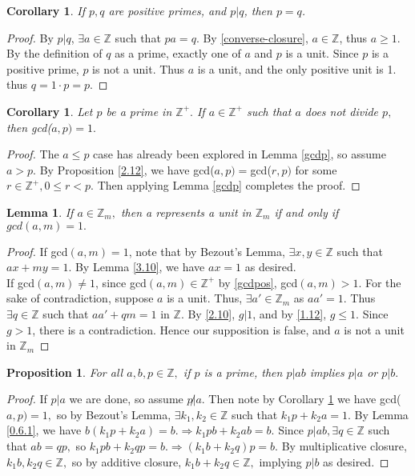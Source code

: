 \documentclass{article}
\newcommand{\Z}{\mathbb{Z}}
\newcommand{\FTSOC}{For the sake of contradiction}
\newcommand{\st}{such that }
\newtheorem{cor}[thm]{Corollary}
\newtheorem{lem}[thm]{Lemma}
\newtheorem{prop}[thm]{Proposition}
\begin{document}
\begin{cor}
\label{gcdp-cor}
If $p, q$ are positive primes, and $p|q$, then $p=q$. 
\end{cor}

\begin{proof}
By $p|q$, $\exists a\in\Z$ \st $pa=q$. By \ref{converse-closure}, $a\in \Z$, thus $a\geq 1$. By the definition of $q$ as a prime, exactly one of $a$ and $p$ is a unit. Since $p$ is a positive prime, $p$ is not a unit. Thus $a$ is a unit, and the only positive unit is 1. thus $q=1\cdot p=p$.
\end{proof}

\begin{cor}
\label{gcdp2} Let $p$ be a prime in $\Z^{+}.$ If $a\in\Z^{+}$ such that $a$ does not divide $p,$ then gcd($a,p)=1.$
\end{cor}
\begin{proof}
The $a\leq p$ case has already been explored in Lemma \ref{gcdp}, so assume $a>p$. By Proposition \ref{2.12}, we have gcd($a,p)=$gcd($r,p)$ for some $r\in \Z^{+}, 0\leq r< p.$ Then applying Lemma \ref{gcdp} completes the proof.
\end{proof}

\begin{lem}
\label{5.9}If $a\in \Z_{m},$ then a represents a unit in $\Z_{m}$ if and only if $gcd(a,m)=1.$
\end{lem}
\begin{proof}
\noindent If gcd$(a,m)=1$, note that by Bezout's Lemma, $\exists x,y\in \Z$ \st $ax+my=1.$ By Lemma \ref{3.10}, we have $ax=1$ as desired.\\

\noindent If gcd$(a,m)\neq 1$, since gcd$(a,m)\in \Z^{+}$ by \ref{gcdpos}, gcd$(a,m)>1$. \FTSOC, suppose $a$ is a unit. Thus, $\exists a' \in \Z_{m}$ as $aa'=1$. Thus $\exists q\in \Z$ \st $aa'+qm=1$ in $\Z$. By \ref{2.10}, $g|1$, and by \ref{1.12}, $g\leq 1$. Since $g>1$, there is a contradiction. Hence our supposition is false, and $a$ is not a unit in $\Z_{m}$
\end{proof}

\begin{prop}
\label{5.7}For all $a,b,p\in \Z,$ if $p$ is a prime, then $p|ab$ implies $p|a$ or $p|b.$
\end{prop}
\begin{proof}
If $p|a$ we are done, so assume $p\not|a.$ Then note by Corollary \ref{gcdp2} we have gcd($a,p)=1,$ so by Bezout's Lemma, $\exists k_{1},k_{2}\in \Z$ such that $k_{1}p+k_{2}a=1.$ By Lemma \ref{0.6.1}, we have $b(k_{1}p+k_{2}a)=b. \Rightarrow k_{1}pb+k_{2}ab = b.$ Since $p|ab, \exists q\in \Z$ \st $ab=qp,$ so $k_{1}pb+k_{2}qp = b. \Rightarrow (k_{1}b + k_{2}q)p=b.$ By multiplicative closure, $k_{1}b, k_{2}q\in \Z,$ so by additive closure, $k_{1}b + k_{2}q\in \Z,$ implying $p|b$ as desired. 
\end{proof}
\end{document}
